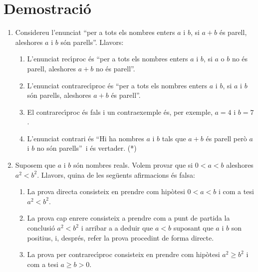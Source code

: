 
\section{Demostració}

\begin{enumerate}
\item Considereu l'enunciat \textquotedblleft per a tots els nombres enters
$a$ i $b$, si $a+b$ \'{e}s parell, aleshores $a$ i $b$ s\'{o}n
parells\textquotedblright. Llavors:

\begin{enumerate}
\item L'enunciat rec\'{\i}proc \'{e}s \textquotedblleft per a tots els nombres
enters $a$ i $b$, si $a$ o $b$ no \'{e}s parell, aleshores $a+b$ no \'{e}s
parell\textquotedblright.

\item L'enunciat contrarec\'{\i}proc \'{e}s \textquotedblleft per a tots els
nombres enters $a$ i $b$, si $a$ i $b$ s\'{o}n parells, aleshores $a+b$ \'{e}s
parell\textquotedblright.

\item El contrarec\'{\i}proc \'{e}s fals i un contraexemple \'{e}s, per
exemple, $a=4$ i $b=7$.

\item L'enunciat contrari \'{e}s \textquotedblleft Hi ha nombres $a$ i $b$
tals que $a+b$ \'{e}s parell per\`{o} $a$ i $b$ no s\'{o}n
parells\textquotedblright\ i \'{e}s vertader. (*)
\end{enumerate}

\item Suposem que $a$ i $b$ s\'{o}n nombres reals. Volem provar que si $0<a<b
$ aleshores $a^{2}<b^{2}$. Llavors, quina de les seg\"{u}ents afirmacions
\'{e}s falsa:

\begin{enumerate}
\item La prova directa consisteix en prendre com hip\`{o}tesi $0<a<b$ i com a
tesi $a^{2}<b^{2}$.

\item La prova cap enrere consisteix a prendre com a punt de partida la
conclusi\'{o} $a^{2}<b^{2}$ i arribar a a deduir que $a<b$ suposant que $a$ i
$b$ son positius, i, despr\'{e}s, refer la prova procedint de forma directe.

\item La prova per contrarec\'{\i}proc consisteix en prendre com hip\`{o}tesi
$a^{2}\geq b^{2}$ i com a tesi $a\geq b>0$.


\end{enumerate}
\end{enumerate}
